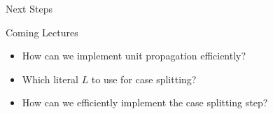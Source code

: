 \documentclass[t]{sdqbeamer}
\begin{document}
\begin{frame}{Next Steps}
\begin{block}{Coming Lectures}
	\begin{itemize}
		\item How can we implement unit propagation efficiently?
		\item Which literal $L$ to use for case splitting?
		\item How can we efficiently implement the case splitting step?
	\end{itemize}
	\end{block}
\end{frame}
\end{document}

